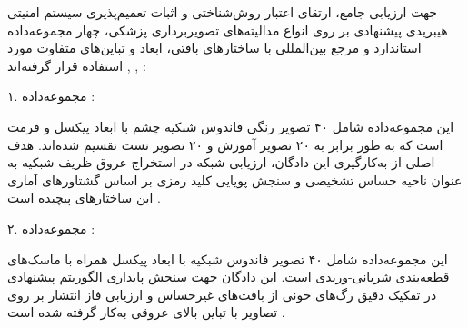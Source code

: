 




جهت ارزیابی جامع، ارتقای اعتبار روش‌شناختی و اثبات تعمیم‌پذیری  سیستم امنیتی هیبریدی پیشنهادی بر روی انواع مدالیته‌های تصویربرداری پزشکی، چهار مجموعه‌داده استاندارد و مرجع بین‌المللی با ساختارهای بافتی، ابعاد و تباین‌های متفاوت مورد استفاده قرار گرفته‌اند , , :\par



۱. مجموعه‌داده  :\par

این مجموعه‌داده شامل ۴۰ تصویر رنگی فاندوس شبکیه چشم با ابعاد  پیکسل و فرمت  است که به طور برابر به ۲۰ تصویر آموزش و ۲۰ تصویر تست تقسیم شده‌اند. هدف اصلی از به‌کارگیری این دادگان، ارزیابی شبکه  در استخراج عروق ظریف شبکیه به عنوان ناحیه حساس تشخیصی  و سنجش پویایی کلید رمزی  بر اساس گشتاورهای آماری این ساختارهای پیچیده است .\par



۲. مجموعه‌داده  :\par

این مجموعه‌داده شامل ۴۰ تصویر فاندوس شبکیه با ابعاد  پیکسل همراه با ماسک‌های قطعه‌بندی شریانی{-}وریدی  است. این دادگان جهت سنجش پایداری الگوریتم پیشنهادی در تفکیک دقیق رگ‌های خونی از بافت‌های غیرحساس و ارزیابی فاز انتشار  بر روی تصاویر با تباین بالای عروقی به‌کار گرفته شده است .\par

